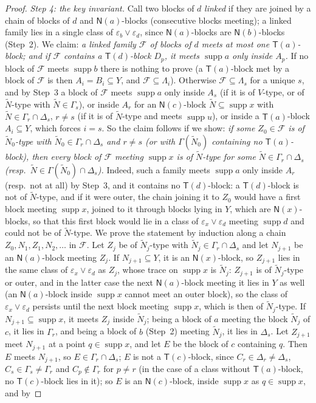 \documentclass[11pt]{amsart}
\theoremstyle{definition}
\newcommand{\supp}{\operatorname{supp}}
\newcommand{\T}{\mathsf{T}}
\newcommand{\N}{\mathsf{N}}
\begin{document}
\begin{proof}
\smallskip
\emph{Step 4: the key invariant.} Call two blocks of $d$ \emph{linked} if they are joined by a chain of blocks of $d$ and $\N(a)$-blocks (consecutive blocks meeting); a linked family lies in a single class of $\varepsilon_b\vee\varepsilon_d$, since $\N(a)$-blocks are $\N(b)$-blocks (Step~2). We claim: \emph{a linked family $\mathcal F$ of blocks of $d$ meets at most one $\T(a)$-block; and if $\mathcal F$ contains a $\T(d)$-block $D_p$, it meets $\supp a$ only inside $A_p$.} If no block of $\mathcal F$ meets $\supp b$ there is nothing to prove (a $\T(a)$-block met by a block of $\mathcal F$ is then $A_i=B_i\subseteq Y$, and $\mathcal F\subseteq\Lambda_i$). Otherwise $\mathcal F\subseteq\Lambda_s$ for a unique $s$, and by Step~3 a block of $\mathcal F$ meets $\supp a$ only inside $A_s$ (if it is of $V$-type, or of $\tilde N$-type with $\tilde N\in\Gamma_s$), or inside $A_r$ for an $\N(c)$-block $\tilde N\subseteq\supp x$ with $\tilde N\in\Gamma_r\cap\Delta_s$, $r\ne s$ (if it is of $\tilde N$-type and meets $\supp u$), or inside a $\T(a)$-block $A_i\subseteq Y$, which forces $i=s$. So the claim follows if we show: \emph{if some $Z_0\in\mathcal F$ is of $\tilde N_0$-type with $\tilde N_0\in\Gamma_r\cap\Delta_s$ and $r\ne s$ (or with $\Gamma(\tilde N_0)$ containing no $\T(a)$-block), then every block of $\mathcal F$ meeting $\supp x$ is of $\tilde N$-type for some $\tilde N\in\Gamma_r\cap\Delta_s$ (resp.\ $\tilde N\in\Gamma(\tilde N_0)\cap\Delta_s$).} Indeed, such a family meets $\supp a$ only inside $A_r$ (resp.\ not at all) by Step~3, and it contains no $\T(d)$-block: a $\T(d)$-block is not of $\tilde N$-type, and if it were outer, the chain joining it to $Z_0$ would have a first block meeting $\supp x$, joined to it through blocks lying in $Y$, which are $\N(x)$-blocks, so that this first block would lie in a class of $\varepsilon_x\vee\varepsilon_d$ meeting $\supp d$ and could not be of $\tilde N$-type. We prove the statement by induction along a chain $Z_0,N_1,Z_1,N_2,\dots$ in $\mathcal F$. Let $Z_j$ be of $\tilde N_j$-type with $\tilde N_j\in\Gamma_r\cap\Delta_s$ and let $N_{j+1}$ be an $\N(a)$-block meeting $Z_j$. If $N_{j+1}\subseteq Y$, it is an $\N(x)$-block, so $Z_{j+1}$ lies in the same class of $\varepsilon_x\vee\varepsilon_d$ as $Z_j$, whose trace on $\supp x$ is $\tilde N_j$: $Z_{j+1}$ is of $\tilde N_j$-type or outer, and in the latter case the next $\N(a)$-block meeting it lies in $Y$ as well (an $\N(a)$-block inside $\supp x$ cannot meet an outer block), so the class of $\varepsilon_x\vee\varepsilon_d$ persists until the next block meeting $\supp x$, which is then of $\tilde N_j$-type. If $N_{j+1}\subseteq\supp x$, it meets $Z_j$ inside $\tilde N_j$; being a block of $a$ meeting the block $\tilde N_j$ of $c$, it lies in $\Gamma_r$, and being a block of $b$ (Step~2) meeting $\tilde N_j$, it lies in $\Delta_s$. Let $Z_{j+1}$ meet $N_{j+1}$ at a point $q\in\supp x$, and let $E$ be the block of $c$ containing $q$. Then $E$ meets $N_{j+1}$, so $E\in\Gamma_r\cap\Delta_s$; $E$ is not a $\T(c)$-block, since $C_r\in\Delta_r\ne\Delta_s$, $C_s\in\Gamma_s\ne\Gamma_r$ and $C_p\notin\Gamma_r$ for $p\ne r$ (in the case of a class without $\T(a)$-block, no $\T(c)$-block lies in it); so $E$ is an $\N(c)$-block, inside $\supp x$ as $q\in\supp x$, and by 
\end{proof}
\end{document}

